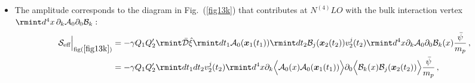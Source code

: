 \begin{itemize}
\begin{align}
\begin{split}
=-4\gamma Q_1 Q_2'\rmint dt \, \Big[\boldsymbol{v}_1\cdot \boldsymbol{v}_2\frac{e^{-r \mu_{\gamma }} \left(-r \mu _{\gamma }+e^{r \mu _{\gamma }}-1\right)}{2 \pi  r^3 \mu_{\gamma }^2}\\ & \hspace{1cm}
+(\boldsymbol{v}_1\cdot \Hat{n})(\boldsymbol{v}_2\cdot \Hat{n})\frac{e^{-r \mu _{\gamma }} \Big(r \mu _{\gamma } \left(r \mu _{\gamma }+3\right)-3 e^{r \mu _{\gamma }}+3\Big)}{2 \pi  r^3 \mu _{\gamma }^2}\Big]\Big(\frac{\Bar{\psi}(\boldsymbol{x}_0(t))}{m_p}\Big)+(1\leftrightarrow 2)\,\\&\sim\mathcal{O}(L^{1/2}v^{9/2}).
\end{split} 
\end{align}
\vspace{-0.6cm}
\item The amplitude corresponds to the diagram in Fig.~(\ref{fig13k}) that contributes at $N^{(4)}LO$ with the bulk interaction vertex $\rmint d^4x\,\partial_k\mathcal{A}_0\partial_0 \mathcal{B}_k :$
\begin{align}
   \mathcal{S}_{\text{eff}}\Big|_{\text{fig}(\ref{fig13k})}
   &=-\gamma Q_1Q_2'\rmint \Bar{\mathcal{D}}\hat{\xi}\rmint dt_1\mathcal{A}_0(\boldsymbol{x}_1(t_1))\rmint dt_2\mathcal{B}_j(\boldsymbol{x}_2(t_2))v_2^j(t_2)\rmint d^4x \partial_k\mathcal{A}_0\partial_0\mathcal{B}_k(x) \frac{ \Bar{\psi}}{m_p}\,,\notag\\
   &=-\gamma Q_1Q_2'\rmint dt_1dt_2v_2^j(t_2)\rmint d^4x\partial_k\Big{\langle}\mathcal{A}_0(x)\mathcal{A}_0(\boldsymbol{x}_1(t_1))\Big{\rangle}\partial_0\Big{\langle}\mathcal{B}_k(x) \mathcal{B}_j(\boldsymbol{x}_2(t_2))\Big{\rangle}\frac{\Bar{\psi}}{m_p}\,,\notag\\

\end{align}
\end{itemize}

